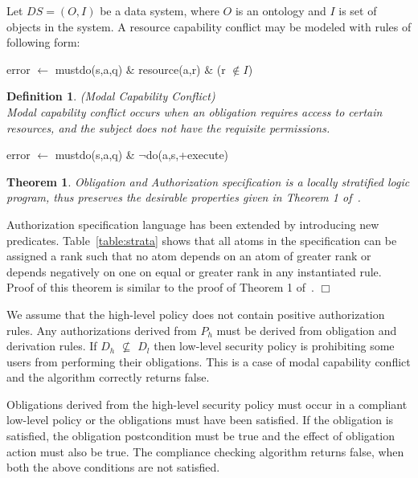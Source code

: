 \documentclass[12pt,journal,letterpaper,onecolumn]{IEEEtran}
\newtheorem{theorem}{Theorem}[section]
\newtheorem{definition}{Definition}[section]
\newenvironment{myproofsketch}
{\noindent {\bf Proof Sketch:}}{\hspace*{\fill}$\Box$}
\begin{document}
Let $DS=(O,I)$ be a data system, where $O$ is an ontology and $I$ is
set of objects in the system. A resource capability conflict may be
modeled with rules of following form:

{\ttfamily error $\leftarrow$ mustdo(s,a,q) $\&$ resource(a,r) $\&$
(r $\not \in I$)}

\begin{definition}(Modal Capability Conflict)\\
Modal capability conflict occurs when an obligation requires access
to certain resources, and the subject does not have the requisite
permissions.
\end{definition}

{\ttfamily error $\leftarrow$ mustdo(s,a,q) \&
$\neg$do(a,s,+execute)}

\begin{theorem}
Obligation and Authorization specification is a locally stratified
logic program, thus preserves the desirable properties given in
Theorem 1 of~\cite{Jajodia01}.
\end{theorem}
\begin{myproofsketch} Authorization specification language has been
extended by introducing new predicates. Table~\ref{table:strata}
shows that all atoms in the specification can be assigned a rank
such that no atom depends on an atom of greater rank or depends
negatively on one on equal or greater rank in any instantiated rule.
Proof of this theorem is similar to the proof of Theorem 1
of~\cite{Jajodia01}.
\end{myproofsketch}


We assume that the high-level policy does not contain positive
authorization rules. Any authorizations derived from $P_h$ must be
derived from obligation and derivation rules. If $D_h$ $\not
\subseteq$ $D_l$ then low-level security policy is prohibiting some
users from performing their obligations. This is a case of modal
capability conflict and the algorithm correctly returns false.

Obligations derived from the high-level security policy must occur
in a compliant low-level policy or the obligations must have been
satisfied. If the obligation is satisfied, the obligation
postcondition must be true and the effect of obligation action must
also be true. The compliance checking algorithm returns false, when
both the above conditions are not satisfied.
\end{document}
